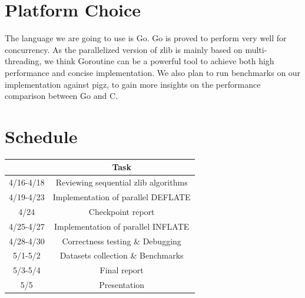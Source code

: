 \documentclass{article}
\begin{document}
\section{Platform Choice}
The language we are going to use is Go. Go is proved to perform very well for concurrency. As the parallelized version of zlib is mainly based on multi-threading, we think Goroutine can be a powerful tool to achieve both high performance and concise implementation. We also plan to run benchmarks on our implementation against pigz, to gain more insights on the performance comparison between Go and C.

\section{Schedule}
\begin{table}[!hbp]
\begin{center}
\begin{tabular}{|c|c|}
\hline
 & Task \\ \hline
4/16-4/18 & Reviewing sequential zlib algorithms \\ \hline
4/19-4/23 & Implementation of parallel DEFLATE \\ \hline
4/24 & Checkpoint report \\ \hline
4/25-4/27 & Implementation of parallel INFLATE \\ \hline
4/28-4/30 & Correctness testing \& Debugging \\ \hline
5/1-5/2 & Datasets collection \& Benchmarks \\ \hline
5/3-5/4 & Final report \\ \hline
5/5 & Presentation \\ \hline
\end{tabular}
\end{center}
\end{table}
\end{document}
